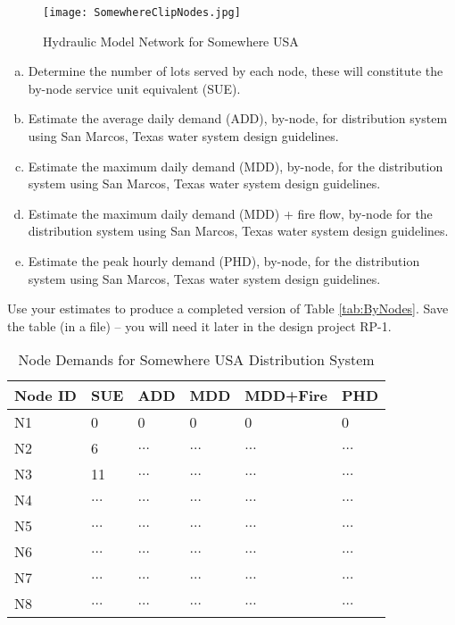 \documentclass[12pt]{article}
\begin{document}
\begin{enumerate}
\begin{figure}[ht!] %
   \centering
   \texttt{[image: SomewhereClipNodes.jpg]} 
   \caption{Hydraulic Model Network for Somewhere USA}
   \label{fig:water_network_layout}
\end{figure}
\begin{enumerate}[a)]
\item Determine the number of lots served by each node, these will constitute the by-node service unit equivalent (SUE).
\item Estimate the average daily demand (ADD), by-node, for distribution system using San Marcos, Texas water system design guidelines.
\item Estimate the maximum daily demand (MDD), by-node, for the distribution system using San Marcos, Texas water system design guidelines.
\item Estimate the maximum daily demand (MDD) + fire flow, by-node for the distribution system using San Marcos, Texas water system design guidelines.
\item Estimate the peak hourly demand (PHD), by-node, for the distribution system using San Marcos, Texas water system design guidelines.
\end{enumerate}
Use your estimates to produce a completed version of Table \ref{tab:ByNodes}.
Save the table (in a file) -- you will need it later in the design project RP-1.
\begin{table}[h!]
   \centering
   \caption{Node Demands for Somewhere USA Distribution System}
   \begin{tabular}{p{1in}p{1in}p{1in}p{1in}p{1in}p{1in}} %
Node ID & SUE & ADD & MDD & MDD+Fire & PHD \\
\hline
\hline
N1 & 0 & 0 & 0 & 0 & 0 \\
N2 & 6 & $\dots$& $\dots$&$\dots$& $\dots$ \\
N3 & 11 & $\dots$& $\dots$&$\dots$& $\dots$ \\
N4 & $\dots$ & $\dots$& $\dots$&$\dots$& $\dots$ \\
N5 & $\dots$ & $\dots$& $\dots$&$\dots$& $\dots$ \\
N6 & $\dots$ & $\dots$& $\dots$&$\dots$& $\dots$ \\
N7 & $\dots$ & $\dots$& $\dots$&$\dots$& $\dots$ \\
N8 & $\dots$ & $\dots$& $\dots$&$\dots$& $\dots$ \\

\end{tabular}
\end{table}
\end{enumerate}
\end{document}
